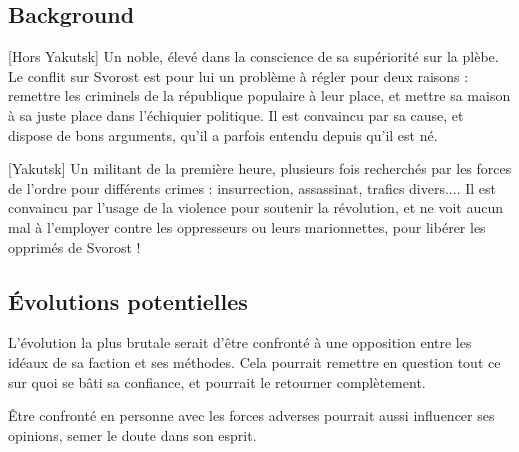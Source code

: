 \documentclass[10pt,a4paper]{article}
\begin{document}
\subsection{Background}
[Hors Yakutsk] Un noble, élevé dans la conscience de sa supériorité sur la plèbe. Le conflit sur Svorost est pour lui un problème à régler pour deux raisons : remettre les criminels de la république populaire à leur place, et mettre sa maison à sa juste place dans l'échiquier politique. Il est convaincu par sa cause, et dispose de bons arguments, qu'il a parfois entendu depuis qu'il est né.

[Yakutsk] Un militant de la première heure, plusieurs fois recherchés par les forces de l'ordre pour différents crimes : insurrection, assassinat, trafics divers.... Il est convaincu par l'usage de la violence pour soutenir la révolution, et ne voit aucun mal à l'employer contre les oppresseurs ou leurs marionnettes, pour libérer les opprimés de Svorost !
\subsection{Évolutions potentielles}
L'évolution la plus brutale serait d'être confronté à une opposition entre les idéaux de sa faction et ses méthodes. Cela pourrait remettre en question tout ce sur quoi se bâti sa confiance, et pourrait le retourner complètement.

Être confronté en personne avec les forces adverses pourrait aussi influencer ses opinions, semer le doute dans son esprit.
\end{document}
